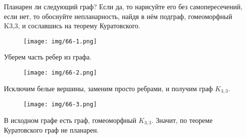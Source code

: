 \begin{task}{5}
	Планарен ли следующий граф? Если да, то нарисуйте его без самопересечений, если нет, то обоснуйте непланарность, найдя в нём подграф, гомеоморфный K3,3, и сославшись на теорему Куратовского.  \\
	\begin{figure}[h]
        \centering
        \texttt{[image: img/66-1.png]}
    \end{figure}
\end{task}

\begin{solution}
	Уберем часть ребер из графа.
		\begin{figure}[h]
        \centering
        \texttt{[image: img/66-2.png]}
    \end{figure}
    
    Исключим белые вершины, заменим просто ребрами, и получим граф $K_{3,3}$.
    	\begin{figure}[h]
        \centering
        \texttt{[image: img/66-3.png]}
    \end{figure}
    
    В исходном графе есть граф, гомеоморфный $K_{3,3}$. Значит, по теореме Куратовского граф не планарен.
\end{solution}